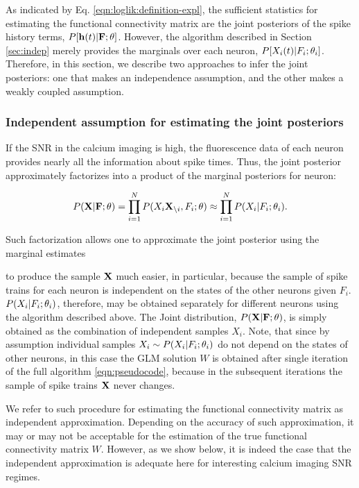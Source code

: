 As indicated by Eq. \eqref{eqn:loglik:definition-expl}, the sufficient statistics for estimating the functional connectivity matrix are the joint posteriors of the spike history terms, $P[\mathbf{h}(t) | {\bf F}; \mathbf{\theta}]$.  However, the algorithm described in Section \ref{sec:indep} merely provides the marginals over each neuron, $P[X_i(t) | F_i; \mathbf{\theta}_i]$.  Therefore, in this section, we describe two approaches to infer the joint posteriors: one that makes an independence assumption, and the other makes a weakly coupled assumption.

\subsubsection{Independent assumption for estimating the joint posteriors}

If the SNR in the calcium imaging is high,  the fluorescence data of each neuron provides nearly all the information about spike times.  Thus, the joint posterior approximately factorizes into a product of the marginal posteriors for neuron:

\begin{equation} 
	P({\bf X}|{\bf F};\theta) = \prod_{i=1}^N P(X_i {\bf X}_{\backslash i}, F_i; \mathbf{\theta}) \approx\prod_{i=1}^N P(X_i|F_i; \mathbf{\theta}_i). \end{equation}
	
\noindent Such factorization allows one to approximate the joint posterior using the marginal estimates

to produce the sample ${\bf X}$ much easier, in particular, because the sample of spike trains for each neuron is independent on the states of the other neurons given $F_i$. $P(X_i|F_i;\mathbf{\theta}_i)$, therefore, may be obtained separately for different neurons using the algorithm described above. The Joint distribution, $P({\bf X}|{\bf F};\theta)$, is simply obtained as the combination of independent samples $X_i$. Note, that since by assumption individual samples $X_i\sim P(X_i|F_i;\mathbf{\theta}_i)$ do not depend on the states of other neurons, in this case the GLM solution $W$ is obtained after single iteration of the full algorithm \ref{eqn:pseudocode}, because in the subsequent iterations the sample of spike trains ${\bf X}$ never changes.

We refer to such procedure for estimating the functional connectivity matrix as independent approximation. Depending on the accuracy of such approximation, it may or may not be acceptable for the estimation of the true functional connectivity matrix $W$. However, as we show below, it is indeed the case that the independent approximation is adequate here for interesting calcium imaging SNR regimes.

